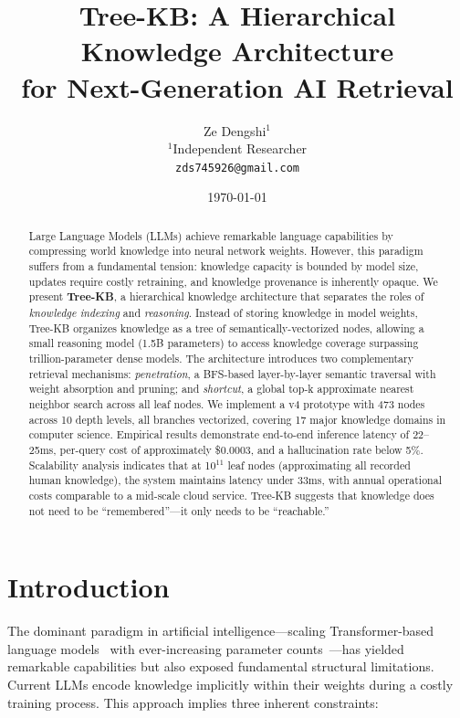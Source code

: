 \documentclass[11pt,a4paper]{article}
\title{\textbf{Tree-KB}: A Hierarchical Knowledge Architecture\\for Next-Generation AI Retrieval}
\author{
  Ze Dengshi$^{1}$ \\
  \small $^{1}$Independent Researcher\\
  \small\texttt{zds745926@gmail.com}\\
}
\date{\today}
\begin{document}
\maketitle

\begin{abstract}
Large Language Models (LLMs) achieve remarkable language capabilities by compressing world knowledge into neural network weights. However, this paradigm suffers from a fundamental tension: knowledge capacity is bounded by model size, updates require costly retraining, and knowledge provenance is inherently opaque. We present \textbf{Tree-KB}, a hierarchical knowledge architecture that separates the roles of \textit{knowledge indexing} and \textit{reasoning}. Instead of storing knowledge in model weights, Tree-KB organizes knowledge as a tree of semantically-vectorized nodes, allowing a small reasoning model (1.5B parameters) to access knowledge coverage surpassing trillion-parameter dense models. The architecture introduces two complementary retrieval mechanisms: \textit{penetration}, a BFS-based layer-by-layer semantic traversal with weight absorption and pruning; and \textit{shortcut}, a global top-k approximate nearest neighbor search across all leaf nodes. We implement a v4 prototype with 473 nodes across 10 depth levels, all branches vectorized, covering 17 major knowledge domains in computer science. Empirical results demonstrate end-to-end inference latency of 22--25ms, per-query cost of approximately \$0.0003, and a hallucination rate below 5\%. Scalability analysis indicates that at 10$^{11}$ leaf nodes (approximating all recorded human knowledge), the system maintains latency under 33ms, with annual operational costs comparable to a mid-scale cloud service. Tree-KB suggests that knowledge does not need to be ``remembered''---it only needs to be ``reachable.''
\end{abstract}

\section{Introduction}
\label{sec:introduction}

The dominant paradigm in artificial intelligence---scaling Transformer-based language models~\cite{vaswani2017attention} with ever-increasing parameter counts~\cite{brown2020language}---has yielded remarkable capabilities but also exposed fundamental structural limitations. Current LLMs encode knowledge implicitly within their weights during a costly training process. This approach implies three inherent constraints:
\end{document}
